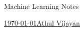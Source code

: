 \documentclass[11pt,paper=a4,answers]{exam}
\begin{document}
\noindent
\begin{minipage}[l]{.1\textwidth}%
\noindent
\end{minipage}
\hfill
\begin{minipage}[r]{.68\textwidth}%
\begin{center}
{\large \bfseries \par
\Large Machine Learning Notes \\[2pt]
\small   \par}
\end{center}
\end{minipage}
\begin{minipage}[l]{.195\textwidth}%
\noindent
{\footnotesize}
\end{minipage}
\par
\noindent
\uline{\today \hfill \normalsize\emph \hfill       Athul Vijayan}\\
\end{document}
